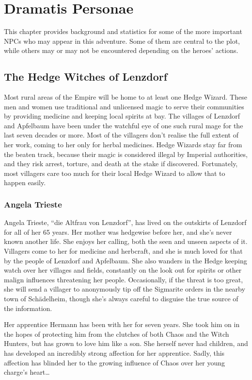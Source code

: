 \chapter{Dramatis Personae}\label{ch:dramatis-personae}
This chapter provides background and statistics for some of the more important
NPCs who may appear in this adventure. Some of them are central to the plot,
while others may or may not be encountered depending on the heroes' actions.

\section{The Hedge Witches of Lenzdorf}
Most rural areas of the Empire will be home to at least one Hedge Wizard. These
men and women use traditional and unlicensed magic to serve their communities
by providing medicine and keeping local spirits at bay. The villages of Lenzdorf
and Apfelbaum have been under the watchful eye of one such rural mage for
the last seven decades or more. Most of the villagers don't realise the full
extent of her work, coming to her only for herbal medicines. Hedge Wizards stay
far from the beaten track, because their magic is considered illegal by Imperial
authorities, and they risk arrest, torture, and death at the stake if
discovered. Fortunately, most villagers care too much for their local Hedge
Wizard to allow that to happen easily.

\subsection{Angela Trieste}
Angela Trieste, ``die Altfrau von Lenzdorf'', has lived on the outskirts of
Lenzdorf for all of her 65 years.
Her mother was hedgewise before her, and she's never known another life. She
enjoys her calling, both the seen and unseen aspects of it. Villagers come to
her for medicine and herbcraft, and she is much loved for that by the people of
Lenzdorf and Apfelbaum. She also wanders in the Hedge keeping watch over her
villages and fields, constantly on the look out for spirits or other malign
influences threatening her people. Occasionally, if the threat is too great,
she will send a villager to anonymously tip off the Sigmarite orders in the
nearby town of Sch{\"a}delheim, though she's always careful to disguise the true
source of the information.

Her apprentice Hermann has been with her for seven years. She took him on in
the hopes of protecting him from the clutches of both Chaos and the Witch
Hunters, but has grown to love him like a son. She herself never had children,
and has developed an incredibly strong affection for her apprentice. Sadly, this
affection has blinded her to the growing influence of Chaos over her young
charge's heart\ldots

